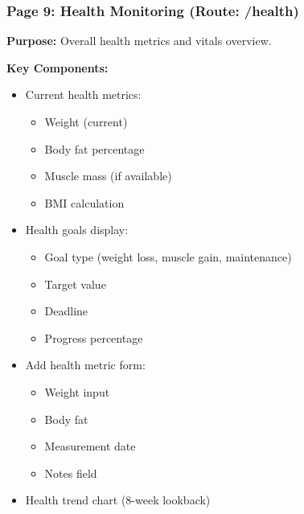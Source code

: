 \documentclass[12pt,a4paper]{article}
\begin{document}
\vspace{0.5cm}
\noindent{}
\vspace{1cm}


\subsubsection*{Page 9: Health Monitoring (Route: /health)}

\textbf{Purpose:} Overall health metrics and vitals overview.

\textbf{Key Components:}
\begin{itemize}[noitemsep, topsep=2pt]
  \item Current health metrics:
    \begin{itemize}[noitemsep, topsep=0pt]
      \item Weight (current)
      \item Body fat percentage
      \item Muscle mass (if available)
      \item BMI calculation
    \end{itemize}
  \item Health goals display:
    \begin{itemize}[noitemsep, topsep=0pt]
      \item Goal type (weight loss, muscle gain, maintenance)
      \item Target value
      \item Deadline
      \item Progress percentage
    \end{itemize}
  \item Add health metric form:
    \begin{itemize}[noitemsep, topsep=0pt]
      \item Weight input
      \item Body fat %
      \item Measurement date
      \item Notes field
    \end{itemize}
  \item Health trend chart (8-week lookback)
\end{itemize}
\end{document}
